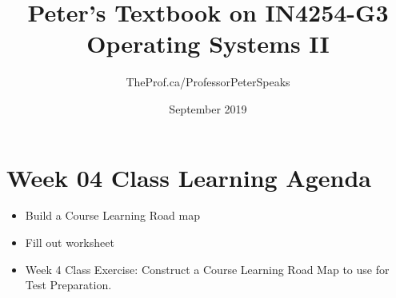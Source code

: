 \documentclass{article}
\title{Peter's Textbook on IN4254-G3 Operating Systems II}
\author{TheProf.ca/ProfessorPeterSpeaks }
\date{September 2019}
\begin{document}
\maketitle

\tableofcontents



\section * {Week 04 Class Learning Agenda}
\begin{itemize}
    \item Build a Course Learning Road map
    \item Fill out worksheet
    \item Week 4 Class Exercise: Construct a Course Learning Road Map to use for Test Preparation.
\end{itemize}











\end{document}
